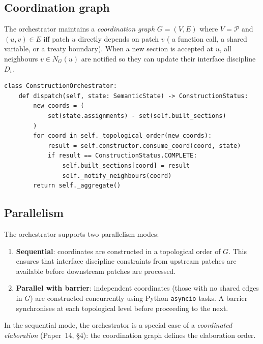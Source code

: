 \documentclass[11pt]{article}
\newcommand{\patchset}{\mathcal{P}}           %
\begin{document}
\subsection{Coordination graph}

The orchestrator maintains a \emph{coordination graph}
$G = (V, E)$ where $V = \patchset$ and $(u,v) \in E$ iff patch $u$
directly depends on patch $v$ (\eg{} a function call, a shared
variable, or a treaty boundary).  When a new section is accepted at
$u$, all neighbours $v \in N_G(u)$ are notified so they can update
their interface discipline $D_v$.

\begin{lstlisting}[style=jugeo-python, caption={Orchestrator dispatch (simplified).}]
class ConstructionOrchestrator:
    def dispatch(self, state: SemanticState) -> ConstructionStatus:
        new_coords = (
            set(state.assignments) - set(self.built_sections)
        )
        for coord in self._topological_order(new_coords):
            result = self.constructor.consume_coord(coord, state)
            if result == ConstructionStatus.COMPLETE:
                self.built_sections[coord] = result
                self._notify_neighbours(coord)
        return self._aggregate()
\end{lstlisting}

\subsection{Parallelism}

The orchestrator supports two parallelism modes:

\begin{enumerate}
  \item \textbf{Sequential}: coordinates are constructed in a
    topological order of $G$.  This ensures that interface discipline
    constraints from upstream patches are available before downstream
    patches are processed.

  \item \textbf{Parallel with barrier}: independent coordinates
    (those with no shared edges in $G$) are constructed concurrently
    using Python \texttt{asyncio} tasks.  A barrier synchronises at
    each topological level before proceeding to the next.
\end{enumerate}

In the sequential mode, the orchestrator is a special case of a
\emph{coordinated elaboration} (Paper~14, \S4): the coordination graph
defines the elaboration order.
\end{document}
